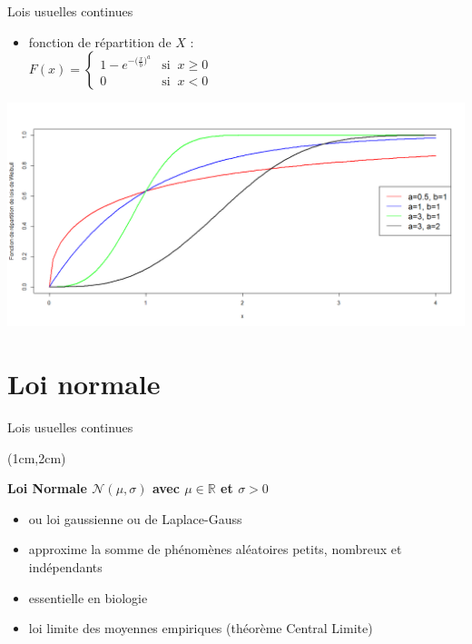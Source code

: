 \documentclass{beamer}
\begin{document}
\begin{frame}{Lois usuelles continues}
\begin{minipage}{0.6\textwidth}
\begin{itemize}
\item \small fonction de répartition de $X$ : \\
$
F(x)=
\begin{cases}
1- e^{ - \big( \frac{x}{b} \big)^{a} }& \mbox {si } \  x\geq 0\\
0 & \mbox {si } \  x<0
\end{cases}
$
\end{itemize}
\end{minipage}
\begin{minipage}{0.3\textwidth}
\includegraphics[scale=0.13]{images/Fdr_weibull.png}
\end{minipage}


\end{frame}


\section{Loi normale}

\begin{frame}{Lois usuelles continues}
\begin{textblock*}{\textwidth}(1cm,2cm)

\begin{center}{\bf \Large Loi Normale $\mathcal{N}(\mu,\sigma)$ avec $\mu\in \mathbb{R}$ et $\sigma>0$} \end{center}
\begin{itemize}
\item ou loi gaussienne ou de Laplace-Gauss
\item approxime la somme de phénomènes aléatoires petits, nombreux et indépendants
\item essentielle en biologie  
\item loi limite des moyennes empiriques (théorème Central Limite)
\end{itemize}

 \end{textblock*}

\end{frame} 
\end{document}
